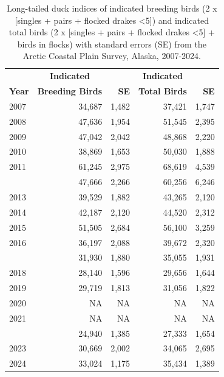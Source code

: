 \documentclass[
]{article}
\begin{document}
\begin{longtable}[t]{lrrrr}

\caption{\label{tbl-LTDU}Long-tailed duck indices of indicated breeding
birds (2 x {[}singles + pairs + flocked drakes \textless5{]}) and
indicated total birds (2 x {[}singles + pairs + flocked drakes
\textless5{]} + birds in flocks) with standard errors (SE) from the
Arctic Coastal Plain Survey, Alaska, 2007-2024.}

\tabularnewline

\\
\toprule
\multicolumn{1}{c}{\textbf{ }} & \multicolumn{1}{c}{\textbf{Indicated}} & \multicolumn{1}{c}{\textbf{ }} & \multicolumn{1}{c}{\textbf{Indicated}} & \multicolumn{1}{c}{\textbf{ }} \\
\cmidrule(l{3pt}r{3pt}){2-2} \cmidrule(l{3pt}r{3pt}){4-4}
\textbf{Year} & \textbf{Breeding Birds} & \textbf{SE} & \textbf{Total Birds} & \textbf{SE}\\
\midrule
2007 & 34,687 & 1,482 & 37,421 & 1,747\\
2008 & 47,636 & 1,954 & 51,545 & 2,395\\
2009 & 47,042 & 2,042 & 48,868 & 2,220\\
2010 & 38,869 & 1,653 & 50,030 & 1,888\\
2011 & 61,245 & 2,975 & 68,619 & 4,539\\
\addlinespace
2012 & 47,666 & 2,266 & 60,256 & 6,246\\
2013 & 39,529 & 1,882 & 43,265 & 2,120\\
2014 & 42,187 & 2,120 & 44,520 & 2,312\\
2015 & 51,505 & 2,684 & 56,100 & 3,259\\
2016 & 36,197 & 2,088 & 39,672 & 2,320\\
\addlinespace
2017 & 31,930 & 1,880 & 35,055 & 1,931\\
2018 & 28,140 & 1,596 & 29,656 & 1,644\\
2019 & 29,719 & 1,813 & 31,056 & 1,822\\
2020 & NA & NA & NA & NA\\
2021 & NA & NA & NA & NA\\
\addlinespace
2022 & 24,940 & 1,385 & 27,333 & 1,654\\
2023 & 30,669 & 2,002 & 34,065 & 2,695\\
2024 & 33,024 & 1,175 & 35,434 & 1,389\\
\bottomrule

\end{longtable}
\end{document}
